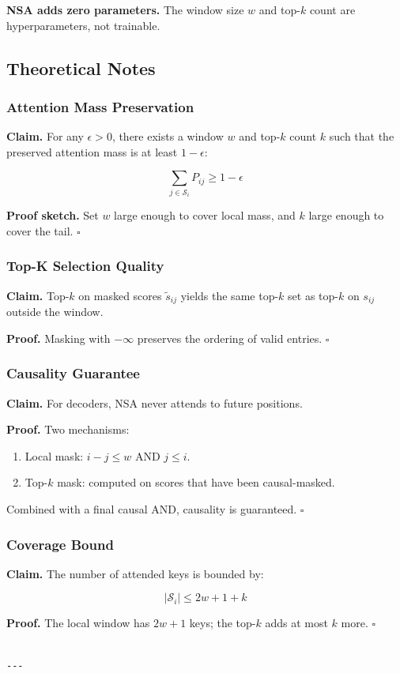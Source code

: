 \textbf{NSA adds zero parameters.} The window size $w$ and top-$k$ count are 
hyperparameters, not trainable.

\subsection{Theoretical Notes}

\subsubsection{Attention Mass Preservation}

\textbf{Claim.} For any $\epsilon > 0$, there exists a window $w$ and top-$k$ 
count $k$ such that the preserved attention mass is at least $1 - \epsilon$:

\[
\sum_{j \in \mathcal{S}_i} P_{ij} \geq 1 - \epsilon
\tag{4.10}
\]

\textbf{Proof sketch.} Set $w$ large enough to cover local mass, and $k$ large 
enough to cover the tail. $\square$

\subsubsection{Top-K Selection Quality}

\textbf{Claim.} Top-$k$ on masked scores $\tilde{s}_{ij}$ yields the same top-$k$ 
set as top-$k$ on $s_{ij}$ outside the window.

\textbf{Proof.} Masking with $-\infty$ preserves the ordering of valid entries. 
$\square$

\subsubsection{Causality Guarantee}

\textbf{Claim.} For decoders, NSA never attends to future positions.

\textbf{Proof.} Two mechanisms:
\begin{enumerate}
\item Local mask: $i - j \leq w$ AND $j \leq i$.
\item Top-$k$ mask: computed on scores that have been causal-masked.

\end{enumerate}
Combined with a final causal AND, causality is guaranteed. $\square$

\subsubsection{Coverage Bound}

\textbf{Claim.} The number of attended keys is bounded by:

\[
|\mathcal{S}_i| \leq 2w + 1 + k
\tag{4.11}
\]

\textbf{Proof.} The local window has $2w + 1$ keys; the top-$k$ adds at most $k$ 
more. $\square$
\begin{lstlisting}

---
\end{lstlisting}